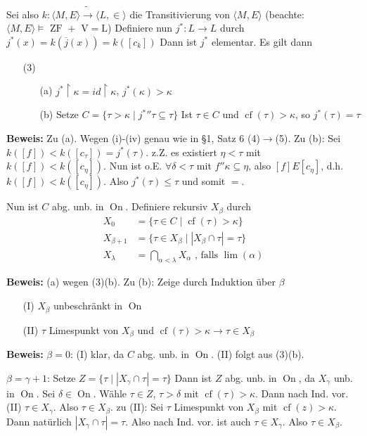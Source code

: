 \documentclass[a4paper,fontsize=11pt]{scrartcl}
\newcommand{\On}{\operatorname{On}}
\newcommand{\cf}{\operatorname{cf}}
\renewcommand{\bar}[1]{\overline{#1}}
\begin{document}
		Sei also $k\colon \langle M,E\rangle \tilde\to\langle L,\in\rangle$ die Transitivierung von $\langle M,E\rangle$ 
		(beachte: $\langle M,E\rangle\models \mbox{ ZF $+$ V$=$L}$)
		Definiere nun $j^*\colon L\to L$ durch $j^*(x)=k(\bar j(x))=k([c_k])$
		Dann ist $j^*$ elementar.
		Es gilt dann \begin{itemize}
			\item[(3)]\begin{itemize}
					\item[(a)] $j^*\upharpoonright\kappa=id\upharpoonright\kappa$, $j^*(\kappa)>\kappa$
					\item[(b)] Setze $C=\{\tau>\kappa\mid {j^{*}} ''\tau\subseteq\tau\}$
						Ist $\tau\in C$ und $\cf(\tau)>\kappa$, so $j^*(\tau)=\tau$
				\end{itemize}
		\end{itemize}
		{\bf Beweis:} Zu (a). Wegen (i)-(iv) genau wie in §1, Satz 6 (4)$\to$(5).
		Zu (b): Sei $k([f])<k([c_{\tau}])=j^*(\tau)$. 
		z.Z. es existiert $\eta<\tau$ mit $k([f])<k([c_{\eta}])$.
		Nun ist o.E. $\forall \delta<\tau$ mit $f''\kappa\subseteq \eta$, also $[f]E[c_{\eta}]$, d.h.
		$k([f])<k([c_{\eta}])$.
		Also $j^*(\tau)\le\tau$ und somit $=$.

		Nun ist $C$ abg. unb. in $\On$.
		Definiere rekursiv $X_{\beta}$ durch 
		\[\begin{align} X_0 &= \{\tau\in C\mid\cf(\tau)>\kappa\} \\
						X_{\beta+1} &= \{\tau\in X_{\beta}\mid |X_{\beta}\cap \tau|=\tau\} \\
						X_{\lambda} &= \bigcap_{\alpha<\lambda} X_{\alpha} \mbox{ , falls }\lim(\alpha) \end{align} \]
		
		{\bf Beweis:} (a) wegen (3)(b). Zu (b): Zeige durch Induktion über $\beta$
		\begin{itemize}
			\item[(I)] $X_{\beta}$ unbeschränkt in $\On$
			\item[(II)] $\tau$ Limespunkt von $X_{\beta}$ und $\cf(\tau)>\kappa\to \tau\in X_{\beta}$
		\end{itemize}
		
		{\bf Beweis:} $\beta=0$: (I) klar, da $C$ abg. unb. in $\On$. (II) folgt aus (3)(b).
			
			$\beta=\gamma+1$: Setze $Z=\{\tau\mid |X_{\gamma}\cap\tau|=\tau\}$ 
			Dann ist $Z$ abg. unb. in $\On$, da $X_{\gamma}$ unb. in $\On$. 
			Sei $\delta\in\On$.
			Wähle $\tau\in Z$, $\tau>\delta$ mit $\cf(\tau)>\kappa$. 
			Dann nach Ind. vor. (II) $\tau\in X_{\gamma}$.
			Also $\tau\in X_{\beta}$.
			zu (II): Sei $\tau$ Limespunkt von $X_{\beta}$ mit $\cf(z)>\kappa$.
			Dann natürlich $|X_{\gamma}\cap\tau|=\tau$.
			Also nach Ind. vor. ist auch $\tau\in X_{\gamma}$.
			Also $\tau\in X_{\beta}$.
			
\end{document}
